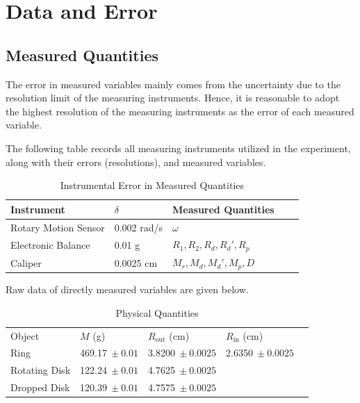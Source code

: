 \section{Data and Error}
\subsection{Measured Quantities}
The error in measured variables mainly comes from the uncertainty due to the resolution limit of the measuring instruments. Hence, it is reasonable to adopt the highest resolution of the measuring instruments as the error of each measured variable. 

The following table records all measuring instruments utilized in the experiment, along with their errors (resolutions), and measured variables.
\begin{table}[!htb]
	\centering
	\begin{tabular}{@{}lllll@{}}
		\toprule
		Instrument & $\delta$ & Measured Quantities &  &  \\ \midrule
		\multicolumn{1}{l|}{Rotary Motion Sensor} & \multicolumn{1}{l|}{0.002 rad/s} & $\omega$ &  &  \\ \cmidrule(r){1-3}
		\multicolumn{1}{l|}{Electronic Balance} & \multicolumn{1}{l|}{0.01 g} & $R_1,R_2,R_d,R_d',R_p$ &  &  \\ \cmidrule(r){1-3}
		\multicolumn{1}{l|}{Caliper} & \multicolumn{1}{l|}{0.0025 cm} & $M_r,M_d,M_d',M_p, D$ &  &  \\ \bottomrule
	\end{tabular}
\caption{Instrumental Error in Measured Quantities}
\end{table}

Raw data of directly measured variables are given below.
\begin{table}[!htb]
	\centering
	\begin{tabular}{@{}lllll@{}}
		\cmidrule(r){1-4}
		Object & $M$ (g) & $R_{\text{out}}$ (cm) & $R_{\text{in}}$ (cm) &  \\ \cmidrule(r){1-4}
		\multicolumn{1}{l|}{Ring} & \multicolumn{1}{l|}{469.17$\ \pm 0.01$} & \multicolumn{1}{l|}{3.8200$\ \pm 0.0025$} & 2.6350$\ \pm 0.0025$ &  \\
		\multicolumn{1}{l|}{Rotating Disk} & \multicolumn{1}{l|}{122.24$\ \pm 0.01$} & \multicolumn{1}{l|}{4.7625$\ \pm 0.0025$} &  &  \\
		\multicolumn{1}{l|}{Dropped Disk} & \multicolumn{1}{l|}{120.39$\ \pm 0.01$} & \multicolumn{1}{l|}{4.7575$\ \pm 0.0025$} &  &  \\ \cmidrule(r){1-4}
	\end{tabular}
\caption{Physical Quantities}
\end{table}


